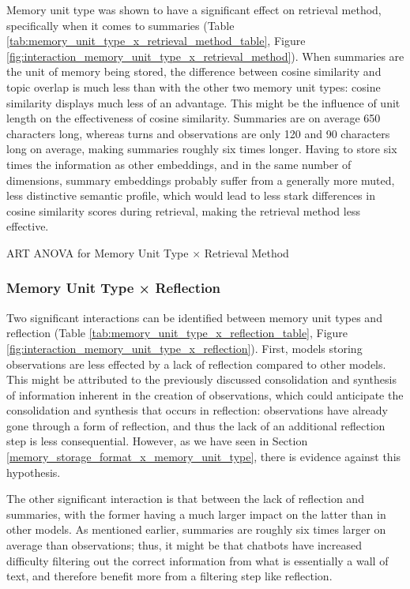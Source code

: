 Memory unit type was shown to have a significant effect on retrieval method, specifically when it comes to summaries (Table \ref{tab:memory_unit_type_x_retrieval_method_table}, Figure \ref{fig:interaction_memory_unit_type_x_retrieval_method}). When summaries are the unit of memory being stored, the difference between cosine similarity and topic overlap is much less than with the other two memory unit types: cosine similarity displays much less of an advantage. This might be the influence of unit length on the effectiveness of cosine similarity. Summaries are on average 650 characters long, whereas turns and observations are only 120 and 90 characters long on average, making summaries roughly six times longer. Having to store six times the information as other embeddings, and in the same number of dimensions, summary embeddings probably suffer from a generally more muted, less distinctive semantic profile, which would lead to less stark differences in cosine similarity scores during retrieval, making the retrieval method less effective.

\begin{table}[htbp]
\centering
\tiny

\caption{ART ANOVA for Memory Unit Type × Retrieval Method}
\label{tab:memory_unit_type_x_retrieval_method_table}
\end{table}


\subsubsection{Memory Unit Type × Reflection}

Two significant interactions can be identified between memory unit types and reflection (Table \ref{tab:memory_unit_type_x_reflection_table}, Figure \ref{fig:interaction_memory_unit_type_x_reflection}). First, models storing observations are less effected by a lack of reflection compared to other models. This might be attributed to the previously discussed consolidation and synthesis of information inherent in the creation of observations, which could anticipate the consolidation and synthesis that occurs in reflection: observations have already gone through a form of reflection, and thus the lack of an additional reflection step is less consequential. However, as we have seen in Section \ref{memory_storage_format_x_memory_unit_type}, there is evidence against this hypothesis.

The other significant interaction is that between the lack of reflection and summaries, with the former having a much larger impact on the latter than in other models. As mentioned earlier, summaries are roughly six times larger on average than observations; thus, it might be that chatbots have increased difficulty filtering out the correct information from what is essentially a wall of text, and therefore benefit more from a filtering step like reflection.

